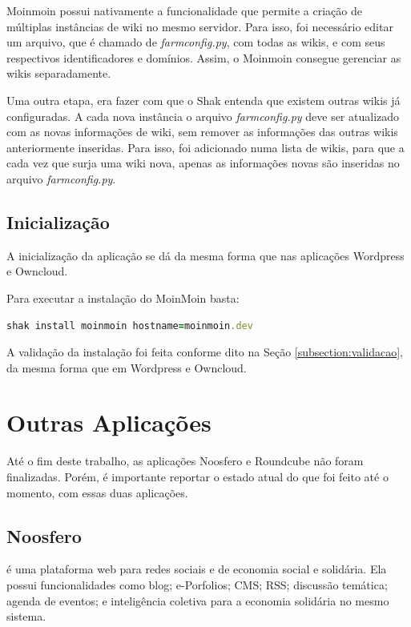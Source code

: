 Moinmoin possui nativamente a funcionalidade que permite a criação de múltiplas 
instâncias de wiki no mesmo servidor. Para isso, foi necessário editar um arquivo,
que é chamado de \textit{farmconfig.py}, com todas as wikis, e com seus 
respectivos identificadores e domínios. Assim, o Moinmoin consegue gerenciar as 
wikis separadamente. 

Uma outra etapa, era fazer com que o Shak entenda que existem outras wikis já 
configuradas. A cada nova instância
o arquivo \textit{farmconfig.py} deve ser atualizado com as novas 
informações de wiki, sem remover as
informações das outras wikis anteriormente inseridas. Para isso, foi adicionado
numa lista de wikis, para que a cada vez que surja uma wiki nova, apenas as
informações novas são inseridas no arquivo \textit{farmconfig.py}.

\subsection{Inicialização}

A inicialização da aplicação se dá da mesma forma que nas aplicações Wordpress
e Owncloud.

Para executar a instalação do MoinMoin basta:

\begin{lstlisting}[basicstyle=\ttfamily, language=Ruby,label=dice_index,caption={Exemplo de execução de instalação do owncloud com shak}]
shak install moinmoin hostname=moinmoin.dev
\end{lstlisting}

A validação da instalação foi feita conforme dito na Seção \ref{subsection:validacao}, 
da mesma forma que em Wordpress e Owncloud.

\section{Outras Aplicações}
\label{sub:appnencerradas}

Até o fim deste trabalho, as aplicações Noosfero e Roundcube não foram finalizadas. 
Porém, é importante reportar o estado atual do que foi feito até o momento,
com essas duas aplicações.

\subsection{Noosfero}
\label{subsub:noosfero}

 é uma plataforma web para redes sociais e 
de economia social e solidária. Ela possui funcionalidades como blog; e-Porfolios; 
CMS; RSS; discussão temática; agenda de eventos; e inteligência coletiva para a 
economia solidária no mesmo sistema.


